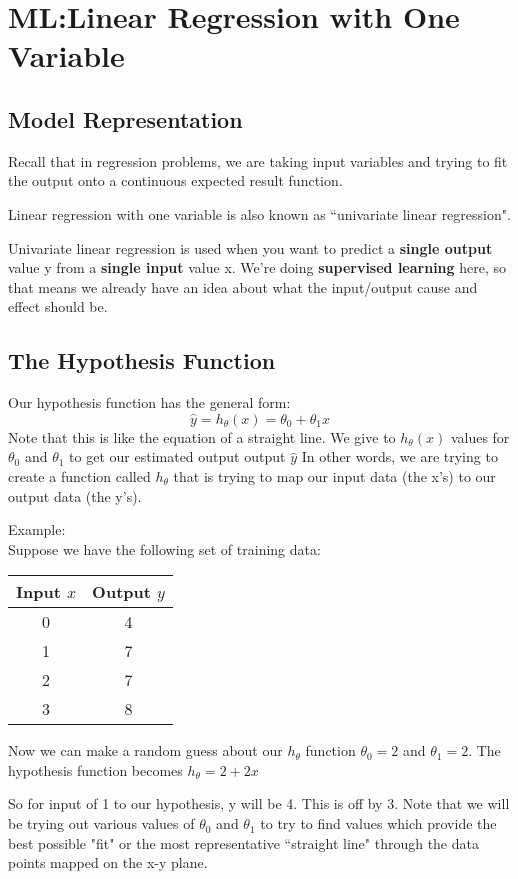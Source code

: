 \section*{ML:Linear Regression with One Variable}
\subsection*{Model Representation}
Recall that in regression problems, we are taking input variables and trying to fit the output onto a continuous expected result function.

Linear regression with one variable is also known as ``univariate linear regression".

Univariate linear regression is used when you want to predict a {\bf single output} value y from a {\bf single input} value x. We're doing {\bf supervised learning} here, so that means we already have an idea about what the input/output cause and effect should be.
\subsection*{The Hypothesis Function}
Our hypothesis function has the general form:
\begin{equation}
\hat{y} = h_\theta(x) = \theta_0 + \theta_1 x
\end{equation}
Note that this is like the equation of a straight line. We give to $h_\theta(x)$ values for $\theta_0 $ and $\theta_1$ to get our estimated output  output $\hat{y}$ In other words, we are trying to create a function called $h_\theta$ that is trying to map our input data (the x's) to our output data (the y's).

Example:\\
Suppose we have the following set of training data:
\begin{center}
\begin{tabular}{|c|c|}
\hline 
{\bf Input $x$} & {\bf Output $y$} \\ 
\hline 
0 & 4 \\ 
\hline 
1 & 7 \\ 
\hline 
2 & 7 \\ 
\hline 
3 & 8 \\ 
\hline 
\end{tabular}
\end{center} 
Now we can make a random guess about our $h_\theta$ function $\theta_0 = 2$ and $\theta_1 = 2$. The hypothesis function becomes $h_\theta = 2 + 2x$

So for input of 1 to our hypothesis, y will be 4. This is off by 3. Note that we will be trying out various values of $\theta_0$ and $\theta_1$ to try to find values which provide the best possible "fit" or the most representative ``straight line" through the data points mapped on the x-y plane.

